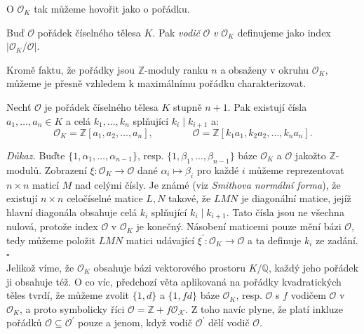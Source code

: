 \documentclass[12pt]{report}
\begin{document}
O $\mathcal{O}_K$ tak můžeme hovořit jako o  pořádku.

\begin{definice}
Buď $\mathcal{O}$ pořádek číselného tělesa $K$. Pak \textit{vodič} $\mathcal{O}$ \textit{v} $\mathcal{O}_K$ definujeme jako index $\vert \mathcal{O}_K / \mathcal{O}\vert$.
\end{definice}

Kromě faktu, že pořádky jsou $\mathbb{Z}$-moduly ranku $n$ a obsaženy v okruhu $\mathcal{O}_K$, můžeme je přesně vzhledem k maximálnímu pořádku charakterizovat.

\begin{veta}
Nechť $\mathcal{O}$ je pořádek číselného tělesa $K$ stupně $n+1$. Pak existují čísla $a_1,\dots,a_n \in K$ a celá $k_1,\dots,k_n$ splňující $k_i \mid k_{i+1}$ a:
\begin{equation*}
\mathcal{O}_K = \mathbb{Z}[a_1,a_2,\dots,a_n], \qquad \qquad \mathcal{O} = \mathbb{Z}[k_1 a_1, k_2 a_2, \dots, k_n a_n].
\end{equation*}
\end{veta}
\noindent \textit{Důkaz.} Buďte $\lbrace 1,\alpha_1,\dots,\alpha_{n-1} \rbrace$, resp. $\lbrace 1,\beta_1,\dots,\beta_{n-1} \rbrace$ báze $\mathcal{O}_K$ a $\mathcal{O}$ jakožto $\mathbb{Z}$-modulů. Zobrazení $\xi:\mathcal{O}_K \longrightarrow \mathcal{O}$ dané $\alpha_i \longmapsto \beta_i$ pro každé $i$ můžeme reprezentovat $n \times n$ maticí $M$ nad celými čísly. Je známé (viz \textit{Smithova normální forma}), že existují $n \times n$ celočíselné matice $L,N$ takové, že $LMN$ je diagonální matice, jejíž hlavní diagonála obsahuje celá $k_i$ splňující $k_i \mid k_{i+1}$. Tato čísla jsou ne všechna nulová, protože index $\mathcal{O}$ v $\mathcal{O}_K$ je konečný. Násobení maticemi pouze mění bázi $\mathcal{O}$, tedy můžeme položit $LMN$ matici udávající $\xi^\prime : \mathcal{O}_K \longrightarrow \mathcal{O}$ a ta definuje $k_i$ ze zadání. \hfill $\square$\\

Jelikož víme, že $\mathcal{O}_K$ obsahuje bázi vektorového prostoru $K/\mathbb{Q}$, každý jeho pořádek ji obsahuje též. O co víc, předchozí věta aplikovaná na pořádky kvadratických těles tvrdí, že můžeme zvolit $\lbrace 1,d \rbrace$ a $\lbrace 1,fd \rbrace$ báze $\mathcal{O}_K$, resp. $\mathcal{O}$ s $f$ vodičem $\mathcal{O}$ v $\mathcal{O}_K$, a proto symbolicky říci $\mathcal{O} = \mathbb{Z}+ f\mathcal{O_K}$. Z toho navíc plyne, že platí inkluze pořádků $\mathcal{O} \subseteq \mathcal{O}^\prime$ pouze a jenom, když vodič $\mathcal{O}^\prime$ dělí vodič $\mathcal{O}$.
\end{document}
